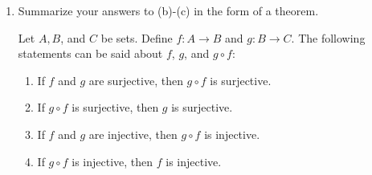 \documentclass[12pt]{article}
\begin{document}
\begin{enumerate}[label=(\alph*)]
\begin{proof}
		Note that $f$ need not be surjective. Consider the example where
		$A = \{1, 2, 3\}$, $B = \{1, 2, 3, 4\}$, and $C = \{1, 2, 3\}$.
		Define $f: A \to B$ such that $f(a) = a$, that is $f(1) = 1$, $f(2) = 2$ and 
		$f(3) = 3$. Define $g: B \to C$ such that $g(1) = 1$, $g(2) = 2$, $g(3) = 3$,
		and $g(4) = 3$. Note that $f$ is not surjective, $g$ is surjective,
		and that $g \circ f$ is surjective. Thus, the surjectivity of $g \circ f$
		does not allow us to make any claims about the surjectivity of $f$.
	\end{proof}
	\pagebreak
	\item Summarize your answers to (b)-(c) in the form of a theorem.
	\begin{theorem}
		Let $A, B$, and $C$ be sets. Define $f: A \to B$ and $g: B \to C$. The following
		statements can be said about $f$, $g$, and $g \circ f$:
		\begin{enumerate}
			\item If $f$ and $g$ are surjective, then $g \circ f$ is surjective.
			\item If $g \circ f$ is surjective, then $g$ is surjective.
			\item If $f$ and $g$ are injective, then $g \circ f$ is injective.
			\item If $g \circ f$ is injective, then $f$ is injective.
		\end{enumerate}
	\end{theorem}
\end{enumerate}
\end{document}
